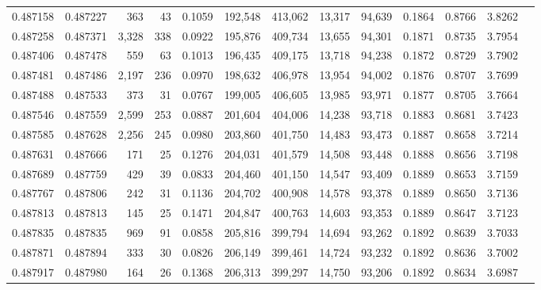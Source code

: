 \begin{tabular}{rrrrrrrrrrrrr}
0.487158 & 0.487227 &   363 &    43 &                                     0.1059 & 192,548 & 413,062 &  13,317 &  94,639 & 0.1864 & 0.8766 & 3.8262 \\
0.487258 & 0.487371 & 3,328 &   338 &                                     0.0922 & 195,876 & 409,734 &  13,655 &  94,301 & 0.1871 & 0.8735 & 3.7954 \\
0.487406 & 0.487478 &   559 &    63 &                                     0.1013 & 196,435 & 409,175 &  13,718 &  94,238 & 0.1872 & 0.8729 & 3.7902 \\
0.487481 & 0.487486 & 2,197 &   236 &                                     0.0970 & 198,632 & 406,978 &  13,954 &  94,002 & 0.1876 & 0.8707 & 3.7699 \\
0.487488 & 0.487533 &   373 &    31 &                                     0.0767 & 199,005 & 406,605 &  13,985 &  93,971 & 0.1877 & 0.8705 & 3.7664 \\
0.487546 & 0.487559 & 2,599 &   253 &                                     0.0887 & 201,604 & 404,006 &  14,238 &  93,718 & 0.1883 & 0.8681 & 3.7423 \\
0.487585 & 0.487628 & 2,256 &   245 &                                     0.0980 & 203,860 & 401,750 &  14,483 &  93,473 & 0.1887 & 0.8658 & 3.7214 \\
0.487631 & 0.487666 &   171 &    25 &                                     0.1276 & 204,031 & 401,579 &  14,508 &  93,448 & 0.1888 & 0.8656 & 3.7198 \\
0.487689 & 0.487759 &   429 &    39 &                                     0.0833 & 204,460 & 401,150 &  14,547 &  93,409 & 0.1889 & 0.8653 & 3.7159 \\
0.487767 & 0.487806 &   242 &    31 &                                     0.1136 & 204,702 & 400,908 &  14,578 &  93,378 & 0.1889 & 0.8650 & 3.7136 \\
0.487813 & 0.487813 &   145 &    25 &                                     0.1471 & 204,847 & 400,763 &  14,603 &  93,353 & 0.1889 & 0.8647 & 3.7123 \\
0.487835 & 0.487835 &   969 &    91 &                                     0.0858 & 205,816 & 399,794 &  14,694 &  93,262 & 0.1892 & 0.8639 & 3.7033 \\
0.487871 & 0.487894 &   333 &    30 &                                     0.0826 & 206,149 & 399,461 &  14,724 &  93,232 & 0.1892 & 0.8636 & 3.7002 \\
0.487917 & 0.487980 &   164 &    26 &                                     0.1368 & 206,313 & 399,297 &  14,750 &  93,206 & 0.1892 & 0.8634 & 3.6987 \\

\end{tabular}
